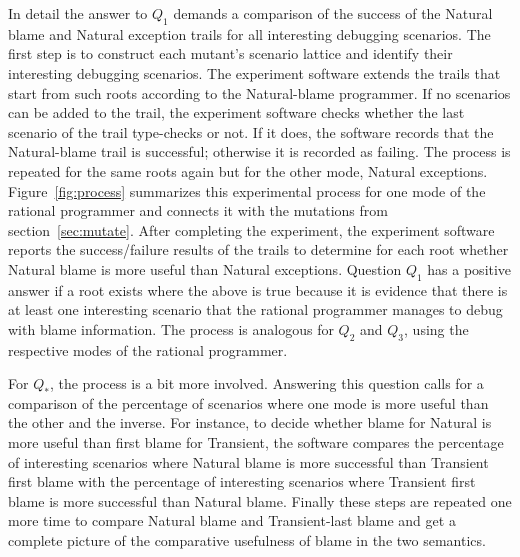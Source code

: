 
In detail the answer to $Q_1$ demands a comparison of the success of the Natural
blame and Natural exception trails for all interesting debugging scenarios.  The
first step is to construct each mutant's scenario lattice and identify their
interesting debugging scenarios.  The experiment software extends the trails that start
from such roots according to the Natural-blame programmer.  If no scenarios can
be added to the trail, the experiment software checks whether the last scenario
of the trail type-checks or not. If it does, the software records that the
Natural-blame trail is successful; otherwise it is recorded as failing. The
process is repeated for the same roots again but for the other mode, Natural
exceptions.  Figure~\ref{fig:process} summarizes this experimental process for
one mode of the rational programmer and connects it with the mutations from
section~\ref{sec:mutate}.  After completing the experiment, the experiment
software reports the success/failure results of the trails to determine for each
root whether Natural blame is more useful than Natural exceptions.  Question
$Q_1$ has a positive answer if a root exists where the above is true because it
is evidence that there is at least one interesting scenario that the rational
programmer manages to debug with blame information.  The process is analogous
for $Q_2$ and $Q_3$, using the respective modes of the rational programmer.

For $Q_*$, the process is a bit more involved. Answering this question calls for
a comparison of the percentage of scenarios where one mode is more useful than
the other and the inverse.  For instance, to decide whether blame for Natural is
more useful than first blame for Transient, the software compares the percentage
of interesting scenarios where Natural blame is more successful than Transient
first blame with the percentage of interesting scenarios where Transient first
blame is more successful than Natural blame.  Finally these steps are repeated
one more time to compare Natural blame and Transient-last blame and get a
complete picture of the comparative usefulness of blame in the two semantics.

